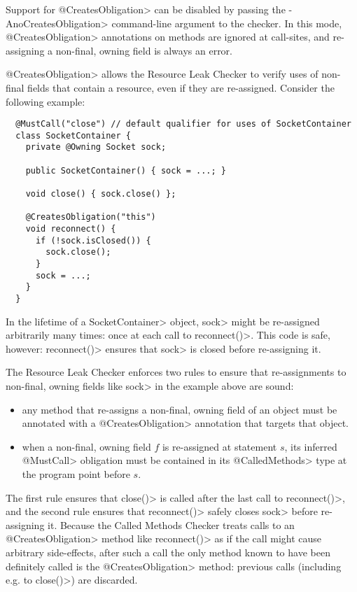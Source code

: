 Support for \<@CreatesObligation> can be disabled by passing the \<-AnoCreatesObligation> command-line
argument to the checker. In this mode, \<@CreatesObligation> annotations on methods are ignored at call-sites,
and re-assigning a non-final, owning field is always an error.



\<@CreatesObligation> allows the Resource Leak Checker to verify uses of non-final fields
that contain a resource, even if they are re-assigned. Consider
the following example:

\begin{verbatim}
  @MustCall("close") // default qualifier for uses of SocketContainer
  class SocketContainer {
    private @Owning Socket sock;

    public SocketContainer() { sock = ...; }

    void close() { sock.close() };

    @CreatesObligation("this")
    void reconnect() {
      if (!sock.isClosed()) {
        sock.close();
      }
      sock = ...;
    }
  }
\end{verbatim}

In the lifetime of a \<SocketContainer> object, \<sock>
might be re-assigned arbitrarily many times: once at each
call to \<reconnect()>. This code is safe, however: \<reconnect()>
ensures that \<sock> is closed before re-assigning it.

The Resource Leak Checker enforces two rules to ensure that
re-assignments to non-final, owning fields like \<sock> in the example
above are sound:
\begin{itemize}
\item any method that re-assigns a non-final, owning field of an object
  must be annotated with a \<@CreatesObligation> annotation
  that targets that object.
\item when a non-final, owning field $f$ is re-assigned at statement $s$,
  its inferred \<@MustCall> obligation must be contained in its \<@CalledMethods>
  type at the program point before $s$.
\end{itemize}
\noindent
The first rule ensures that \<close()> is called after the last call
to \<reconnect()>, and the second rule ensures that \<reconnect()>
safely closes \<sock> before re-assigning it. Because the Called Methods Checker
treats calls to an \<@CreatesObligation> method like \<reconnect()> as if the call might
cause arbitrary side-effects, after such a call the only method known to have been
definitely called is the \<@CreatesObligation> method: previous calls
(including e.g. to \<close()>) are discarded.


